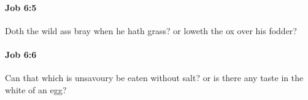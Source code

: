 		\paragraph{Job 6:5} %
			\label{JOB-6-5}

			Doth the wild ass bray when he hath grass? or loweth the ox over his fodder?


		\paragraph{Job 6:6} %
			\label{JOB-6-6}

			Can that which is unsavoury be eaten without salt? or is there any taste in the white of an egg?


